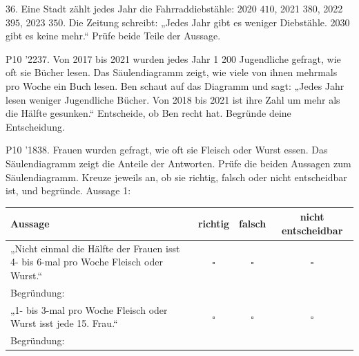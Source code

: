 \documentclass[11pt]{article}
\begin{document}
\pfgruppe{}
\begin{pfaufg}{}{36.}{}
Eine Stadt zählt jedes Jahr die Fahrraddiebstähle: 2020 $410$, 2021 $380$, 2022 $395$, 2023 $350$. Die Zeitung schreibt: „Jedes Jahr gibt es weniger Diebstähle. 2030 gibt es keine mehr.“ Prüfe beide Teile der Aussage.
\end{pfaufg}
\pfgruppe{}
\begin{pfaufg}{P10 ’22}{37.}{}
Von 2017 bis 2021 wurden jedes Jahr 1 200 Jugendliche gefragt, wie oft sie Bücher lesen. Das Säulendiagramm zeigt, wie viele von ihnen mehrmals pro Woche ein Buch lesen. Ben schaut auf das Diagramm und sagt: „Jedes Jahr lesen weniger Jugendliche Bücher. Von 2018 bis 2021 ist ihre Zahl um mehr als die Hälfte gesunken.“ Entscheide, ob Ben recht hat. Begründe deine Entscheidung.
\par\smallskip\noindent {}\par
{}
\end{pfaufg}
\pfgruppe{}
\begin{pfaufg}{P10 ’18}{\llap{\textasteriskcentered\,}38.}{}
Frauen wurden gefragt, wie oft sie Fleisch oder Wurst essen. Das Säulendiagramm zeigt die Anteile der Antworten. Prüfe die beiden Aussagen zum Säulendiagramm. Kreuze jeweils an, ob sie richtig, falsch oder nicht entscheidbar ist, und begründe. Aussage 1:
\par\smallskip\noindent \begingroup\renewcommand{\arraystretch}{1.5}\begin{tabular}{|p{5.5cm}|c|c|c|}\hline Aussage & richtig & falsch & nicht entscheidbar \\ \hline „Nicht einmal die Hälfte der Frauen isst 4- bis 6-mal pro Woche Fleisch oder Wurst.“ & $\square$ & $\square$ & $\square$ \\ \hline \multicolumn{4}{|l|}{\rule{0pt}{3.2ex}\footnotesize\color{mbgrau}Begründung:} \\ \hline „1- bis 3-mal pro Woche Fleisch oder Wurst isst jede 15. Frau.“ & $\square$ & $\square$ & $\square$ \\ \hline \multicolumn{4}{|l|}{\rule{0pt}{3.2ex}\footnotesize\color{mbgrau}Begründung:} \\ \hline\end{tabular}\endgroup\par
{}
\end{pfaufg}
\end{document}
